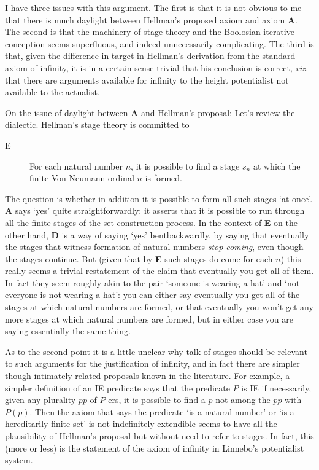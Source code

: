 \documentclass{asl}
\theoremstyle{definition}
\begin{document}
I have three issues with this argument. The first is that it is not obvious to me that there is much daylight between Hellman's proposed axiom and axiom {\bf A}. The second is that the machinery of stage theory and the Boolosian iterative conception seems superfluous, and indeed unnecessarily complicating. The third is that, given the difference in target in Hellman's derivation from the standard axiom of infinity, it is in a certain sense trivial that his conclusion is correct, \emph{viz.} that there are arguments available for infinity to the height potentialist not available to the actualist.

On the issue of daylight between {\bf A} and Hellman's proposal: Let's review the dialectic. Hellman's stage theory is committed to \begin{description} \item[E] For each natural number $n$, it is possible to find a stage $s_n$ at which the finite Von Neumann ordinal $n$ is formed.\end{description} 
The question is whether in addition it is possible to form all such stages `at once'. {\bf A} says `yes' quite straightforwardly: it asserts that it is possible to run through all the finite stages of the set construction process. In the context of {\bf E} on the other hand, {\bf D} is a way of saying `yes' bentbackwardly, by saying that eventually the stages that witness formation of natural numbers \emph{stop coming}, even though the stages continue. But (given that by {\bf E} such stages do come for each $n$) this really seems a trivial restatement of the claim that eventually you get all of them.  In fact they seem roughly akin to the pair `someone is wearing a hat' and `not everyone is not wearing a hat': you can either say eventually you get all of the stages at which natural numbers are formed, or that eventually you won't get any more stages at which natural numbers are formed, but in either case you are saying essentially the same thing.

As to the second point it is a little unclear why talk of stages should be relevant to such arguments for the justification of infinity, and in fact there are simpler though intimately related proposals known in the literature. For example, a simpler definition of an IE predicate says that the predicate $P$ is IE if necessarily, given any plurality $pp$ of $P$-ers, it is possible to find a $p$ not among the $pp$ with $P(p)$. Then the axiom that says the predicate `is a natural number' or `is a hereditarily finite set' is not indefinitely extendible seems to have all the plausibility of Hellman's proposal but without need to refer to stages. In fact, this (more or less) is the statement of the axiom of infinity in Linnebo's potentialist system.
\end{document}
